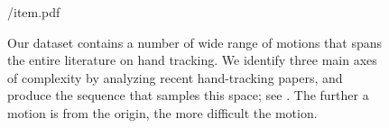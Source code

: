 \begin{figure}[t!]
\centering
\begin{overpic} 
[width=\linewidth]
{\currfiledir/item.pdf}
\end{overpic}
\caption{
% 
Our dataset contains a number of wide range of motions that spans the entire literature on hand tracking. We identify three main axes of complexity by analyzing recent hand-tracking papers, and produce the  sequence that samples this space; see . 
The further a motion is from the origin, the more difficult the motion. 
% 
}
\label{fig:motiontypes}
\end{figure}
